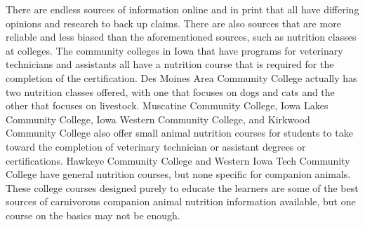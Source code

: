 \par There are endless sources of information online and in print that all have differing opinions and research to back up claims. There are also sources that are more reliable and less biased than the aforementioned sources, such as nutrition classes at colleges. The community colleges in Iowa that have programs for veterinary technicians and assistants all have a nutrition course that is required for the completion of the certification. Des Moines Area Community College actually has two nutrition classes offered, with one that focuses on dogs and cats and the other that focuses on livestock\citep{dmacc}. Muscatine Community College, Iowa Lakes Community College, Iowa Western Community College, and Kirkwood Community College also offer small animal nutrition courses for students to take toward the completion of veterinary technician or assistant degrees or certifications\citep{mcc,iwcc,ilcc,kcc}. Hawkeye Community College and Western Iowa Tech Community College have general nutrition courses, but none specific for companion animals\citep{hcc,witcc}. These college courses designed purely to educate the learners are some of the best sources of carnivorous companion animal nutrition information available, but one course on the basics may not be enough.

